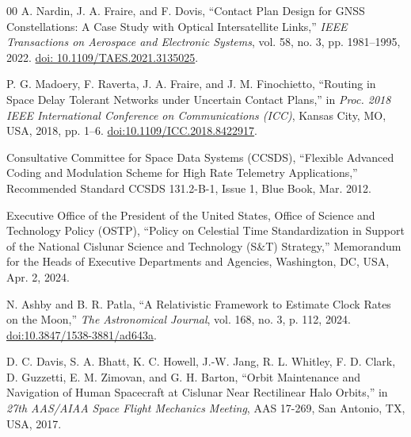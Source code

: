 \documentclass[a4paper,fleqn]{cas-sc}
\begin{document}
\begin{thebibliography}{00}
 {\color{revcolor}A. Nardin, J. A. Fraire, and F. Dovis, ``Contact Plan Design for GNSS Constellations: A Case Study with Optical Intersatellite Links,'' \textit{IEEE Transactions on Aerospace and Electronic Systems}, vol. 58, no. 3, pp. 1981--1995, 2022. \href{https://doi.org/10.1109/TAES.2021.3135025}{doi: 10.1109/TAES.2021.3135025}.}

 {\color{revcolor}P. G. Madoery, F. Raverta, J. A. Fraire, and J. M. Finochietto, ``Routing in Space Delay Tolerant Networks under Uncertain Contact Plans,'' in \textit{Proc. 2018 IEEE International Conference on Communications (ICC)}, Kansas City, MO, USA, 2018, pp. 1--6. \href{https://doi.org/10.1109/ICC.2018.8422917}{doi:10.1109/ICC.2018.8422917}.}

 {\color{revcolor}Consultative Committee for Space Data Systems (CCSDS), ``Flexible Advanced Coding and Modulation Scheme for High Rate Telemetry Applications,'' Recommended Standard CCSDS 131.2-B-1, Issue 1, Blue Book, Mar. 2012.}

 {\color{revcolor}Executive Office of the President of the United States, Office of Science and Technology Policy (OSTP), ``Policy on Celestial Time Standardization in Support of the National Cislunar Science and Technology (S\&T) Strategy,'' Memorandum for the Heads of Executive Departments and Agencies, Washington, DC, USA, Apr. 2, 2024.}

 {\color{revcolor}N. Ashby and B. R. Patla, ``A Relativistic Framework to Estimate Clock Rates on the Moon,'' \textit{The Astronomical Journal}, vol. 168, no. 3, p. 112, 2024. \href{https://doi.org/10.3847/1538-3881/ad643a}{doi:10.3847/1538-3881/ad643a}.}

 {\color{revcolor}D. C. Davis, S. A. Bhatt, K. C. Howell, J.-W. Jang, R. L. Whitley, F. D. Clark, D. Guzzetti, E. M. Zimovan, and G. H. Barton, ``Orbit Maintenance and Navigation of Human Spacecraft at Cislunar Near Rectilinear Halo Orbits,'' in \textit{27th AAS/AIAA Space Flight Mechanics Meeting}, AAS 17-269, San Antonio, TX, USA, 2017.}

\end{thebibliography}

\nolinenumbers
\end{document}
